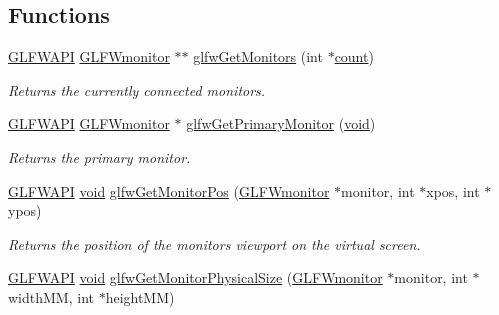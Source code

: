 \subsection*{Functions}
\begin{DoxyCompactItemize}
\item 
\mbox{\hyperlink{glfw3_8h_a56da5036b2cc259351ae22fd6439bb47}{G\+L\+F\+W\+A\+PI}} \mbox{\hyperlink{group__monitor_ga8d9efd1cde9426692c73fe40437d0ae3}{G\+L\+F\+Wmonitor}} $\ast$$\ast$ \mbox{\hyperlink{group__monitor_gab4d483284c57e28837bc2cd9639e9665}{glfw\+Get\+Monitors}} (int $\ast$\mbox{\hyperlink{glad_8h_a83e2dd3e98558b907ab7fb03cee26bda}{count}})
\begin{DoxyCompactList}\small\item\em Returns the currently connected monitors. \end{DoxyCompactList}\item 
\mbox{\hyperlink{glfw3_8h_a56da5036b2cc259351ae22fd6439bb47}{G\+L\+F\+W\+A\+PI}} \mbox{\hyperlink{group__monitor_ga8d9efd1cde9426692c73fe40437d0ae3}{G\+L\+F\+Wmonitor}} $\ast$ \mbox{\hyperlink{group__monitor_ga59ea49f377fe701dd76764183e64d9f4}{glfw\+Get\+Primary\+Monitor}} (\mbox{\hyperlink{glad_8h_a950fc91edb4504f62f1c577bf4727c29}{void}})
\begin{DoxyCompactList}\small\item\em Returns the primary monitor. \end{DoxyCompactList}\item 
\mbox{\hyperlink{glfw3_8h_a56da5036b2cc259351ae22fd6439bb47}{G\+L\+F\+W\+A\+PI}} \mbox{\hyperlink{glad_8h_a950fc91edb4504f62f1c577bf4727c29}{void}} \mbox{\hyperlink{group__monitor_ga45b5481a614ad7beb2aade9746d07563}{glfw\+Get\+Monitor\+Pos}} (\mbox{\hyperlink{group__monitor_ga8d9efd1cde9426692c73fe40437d0ae3}{G\+L\+F\+Wmonitor}} $\ast$monitor, int $\ast$xpos, int $\ast$ypos)
\begin{DoxyCompactList}\small\item\em Returns the position of the monitor\textquotesingle{}s viewport on the virtual screen. \end{DoxyCompactList}\item 
\mbox{\hyperlink{glfw3_8h_a56da5036b2cc259351ae22fd6439bb47}{G\+L\+F\+W\+A\+PI}} \mbox{\hyperlink{glad_8h_a950fc91edb4504f62f1c577bf4727c29}{void}} \mbox{\hyperlink{group__monitor_gad0e93a9e42b32394369cabbbdc1ab702}{glfw\+Get\+Monitor\+Physical\+Size}} (\mbox{\hyperlink{group__monitor_ga8d9efd1cde9426692c73fe40437d0ae3}{G\+L\+F\+Wmonitor}} $\ast$monitor, int $\ast$width\+MM, int $\ast$height\+MM)
$$
\end{DoxyCompactItemize}

